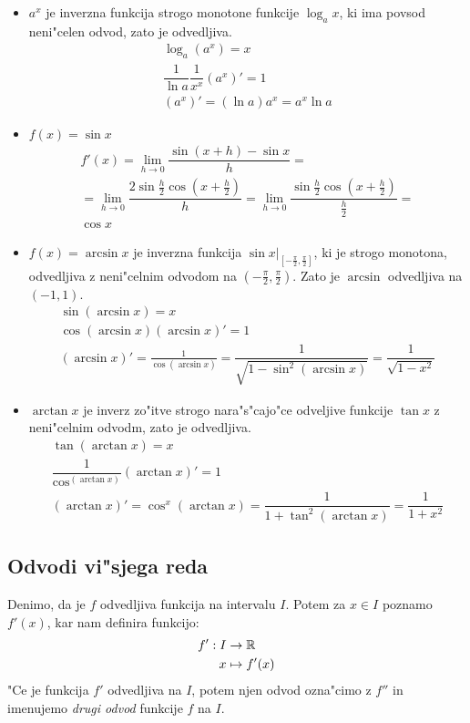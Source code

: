 \begin{itemize}
\item $a^x$ je inverzna funkcija strogo monotone funkcije $\log_a x$, ki ima povsod neni"celen odvod, zato je odvedljiva.
\label{proof:3}
\begin{gather*}
\log_a (a^x) = x \\
\dfrac{1}{\ln a}\dfrac{1}{x^x} (a^x)' = 1 \\
(a^x)' = (\ln a) a^x = a^x \ln a
\end{gather*}

\item $f(x) = \sin x$
\label{proof:4}
\begin{multline*}
f'(x) = \lim_{h \to 0} \dfrac{\sin (x+h) - \sin x}{h} = \\
= \lim_{h \to 0} \dfrac{2\sin \frac{h}{2}\cos(x + \frac{h}{2})}{h} = \lim_{h \to 0} \dfrac{\sin \frac{h}{2}\cos(x + \frac{h}{2})}{\frac{h}{2}} = \\
\cos x
\end{multline*}

\item 
\label{proof:5}
$f(x) = \arcsin x$ je inverzna funkcija $\sin x|_{[- \frac{\pi}{2}, \frac{\pi}{2}]}$, ki je strogo monotona, odvedljiva z neni"celnim odvodom na $(- \frac{\pi}{2}, \frac{\pi}{2})$. Zato je $\arcsin$ odvedljiva na $(-1, 1)$.
\begin{gather*}
\sin (\arcsin x) = x \\
\cos ( \arcsin x) (\arcsin x)' = 1 \\
(\arcsin x)' = \frac{1}{\cos (\arcsin x)} = \dfrac{1}{\sqrt{1 - \sin^2 (\arcsin x)}} = \dfrac{1}{\sqrt{1 - x^2}}
\end{gather*}

\item 
\label{proof:6}
$\arctan x$ je inverz zo"itve strogo nara"s"cajo"ce odveljive funkcije $\tan x$ z neni"celnim odvodm, zato je odvedljiva.
\begin{gather*}
\tan(\arctan x) = x \\
\dfrac{1}{\cos^(\arctan x)} (\arctan x)' = 1 \\
(\arctan x)' = \cos^x (\arctan x) = \dfrac{1}{1 + \tan^2 (\arctan x)} = \dfrac{1}{1 + x^2}
\end{gather*}
\end{itemize}
%
\subsection{Odvodi vi"sjega reda}
Denimo, da je $f$ odvedljiva funkcija na intervalu $I$. Potem za $x \in I$ poznamo $f'(x)$, kar nam definira funkcijo:
\begin{align*}
f': I &\to \mathbb{R} \\
x &\mapsto f'(x)
\end{align*}
"Ce je funkcija $f'$ odvedljiva na $I$, potem njen odvod ozna"cimo z $f''$ in imenujemo \emph{drugi odvod} funkcije $f$ na $I$.

